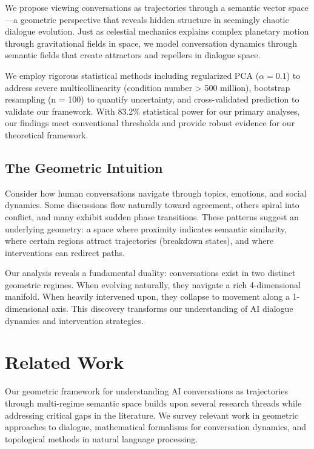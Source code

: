\documentclass[11pt,letterpaper]{article}
\newcommand{\powerOutcomeGroups}{83.2\%}
\newcommand{\regularizationAlpha}{0.1}
\newcommand{\bootstrapSamples}{100}
\begin{document}
We propose viewing conversations as trajectories through a semantic vector space—a geometric perspective that reveals hidden structure in seemingly chaotic dialogue evolution. Just as celestial mechanics explains complex planetary motion through gravitational fields in space, we model conversation dynamics through semantic fields that create attractors and repellers in dialogue space.

We employ rigorous statistical methods including regularized PCA ($\alpha = \regularizationAlpha{}$) to address severe multicollinearity (condition number > 500 million), bootstrap resampling (n = \bootstrapSamples{}) to quantify uncertainty, and cross-validated prediction to validate our framework. With \powerOutcomeGroups{} statistical power for our primary analyses, our findings meet conventional thresholds and provide robust evidence for our theoretical framework.

\subsection{The Geometric Intuition}

Consider how human conversations navigate through topics, emotions, and social dynamics. Some discussions flow naturally toward agreement, others spiral into conflict, and many exhibit sudden phase transitions. These patterns suggest an underlying geometry: a space where proximity indicates semantic similarity, where certain regions attract trajectories (breakdown states), and where interventions can redirect paths.

Our analysis reveals a fundamental duality: conversations exist in two distinct geometric regimes. When evolving naturally, they navigate a rich 4-dimensional manifold. When heavily intervened upon, they collapse to movement along a 1-dimensional axis. This discovery transforms our understanding of AI dialogue dynamics and intervention strategies.

\section{Related Work}

Our geometric framework for understanding AI conversations as trajectories through multi-regime semantic space builds upon several research threads while addressing critical gaps in the literature. We survey relevant work in geometric approaches to dialogue, mathematical formalisms for conversation dynamics, and topological methods in natural language processing.
\end{document}
